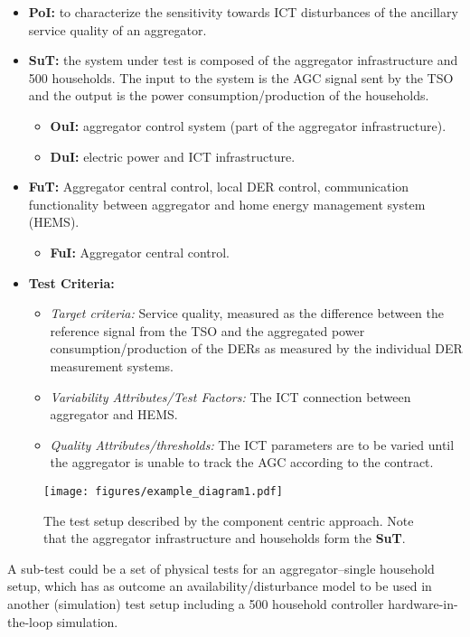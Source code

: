 \begin{itemize}
    \item \textbf{PoI:} to characterize the sensitivity towards ICT disturbances of the ancillary service quality of an aggregator.
    \item \textbf{SuT:} the system under test is composed of the aggregator infrastructure and 500 households. The input to the system is the AGC signal sent by the TSO and the output is the power consumption/production of the households.
    \begin{itemize}
    \item \textbf{OuI:} aggregator control system (part of the aggregator infrastructure).
    \item \textbf{DuI:} electric power and ICT infrastructure.
    \end{itemize}
    \item \textbf{FuT:} Aggregator central control, local DER control, communication functionality between aggregator and home energy management system (HEMS).
    \begin{itemize}
        \item \textbf{FuI:} Aggregator central control.
    \end{itemize}
    \item \textbf{Test Criteria:} 
    \begin{itemize}
        \item \emph{Target criteria:} Service quality, measured as the difference between the reference signal from the TSO and the aggregated power consumption/production of the DERs as measured by the individual DER measurement systems.
        \item \emph{Variability Attributes/Test Factors:} The ICT connection between aggregator and HEMS.%
        \item \emph{Quality Attributes/thresholds:} The ICT parameters are to be varied until the aggregator is unable to track the AGC according to the contract.
    \end{itemize}
\end{itemize}

\begin{figure}[!t]
\centering
\texttt{[image: figures/example\_diagram1.pdf]}
\caption{The test setup described by the component centric approach. Note that the aggregator infrastructure and households form the \textbf{SuT}.}%
\label{fig:examplediagram}
\end{figure}

A sub-test could be a set of physical tests for an aggregator--single household setup, which has as outcome an availability/disturbance model to be used in another (simulation) test setup including a 500 household controller hardware-in-the-loop simulation.